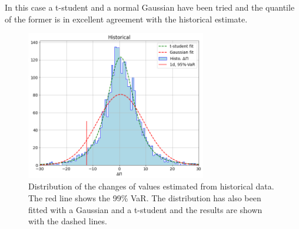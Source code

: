 In this case a t-student and a normal Gaussian have been tried and the quantile of the former is in excellent agreement with the historical estimate.

\begin{figure}[htb]
\centering
\includegraphics[width=0.7\textwidth]{figures/historical_var}
\caption{Distribution of the changes of values estimated from historical data. The red line shows the 99\% VaR. The distribution has also been fitted with a Gaussian and a t-student and the results are shown with the dashed lines.}
\label{fig:hist_var}
\end{figure}

%
%
%
%
%
%

